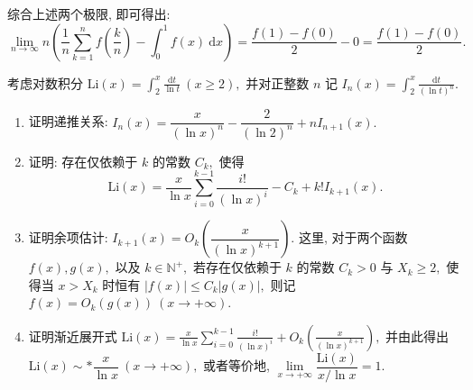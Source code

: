 \begin{solution}
\begin{enumerate}
综合上述两个极限, 即可得出:
\[
\lim_{n \to \infty} n \left( \frac{1}{n} \sum_{k=1}^n f\left(\frac{k}{n}\right) - \int_0^1 f(x) ~ \mathrm{d}x \right) = \frac{f(1) - f(0)}{2} - 0 = \frac{f(1) - f(0)}{2}.
\]
\end{enumerate}
\end{solution}

\begin{question}[points = 12]
考虑对数积分 $\displaystyle \mathrm{Li}(x) = \int_2^x \frac{\mathrm{d}t}{\ln t}\ (x \ge 2),$ 并对正整数 $n$ 记 $\displaystyle I_n(x) = \int_2^x \frac{\mathrm{d}t}{(\ln t)^n}.$
\begin{enumerate}
\item 证明递推关系: $I_n(x) = \dfrac{x}{(\ln x)^n} - \dfrac{2}{(\ln 2)^n} + n I_{n+1}(x).$
\item 证明: 存在仅依赖于 $k$ 的常数 $C_k,$ 使得
$$\mathrm{Li}(x) = \frac{x}{\ln x} \sum_{i=0}^{k-1} \frac{i!}{(\ln x)^i} - C_k + k! I_{k+1}(x).$$
\item 证明余项估计: $I_{k+1}(x) = O_k\left( \dfrac{x}{(\ln x)^{k+1}} \right).$ 这里, 对于两个函数 $f(x), g(x),$ 以及 $k \in \mathbb{N}^+,$ 若存在仅依赖于 $k$ 的常数 $C_k > 0$ 与 $X_k \ge 2,$ 使得当 $x > X_k$ 时恒有 $|f(x)| \leqslant C_k|g(x)|,$ 则记 $f(x) = O_k(g(x))\ (x \to +\infty).$
\item 证明渐近展开式 $\displaystyle \mathrm{Li}(x) = \frac{x}{\ln x} \sum_{i=0}^{k-1} \frac{i!}{(\ln x)^i} + O_k\left( \frac{x}{(\ln x)^{k+1}} \right),$ 并由此得出 $\mathrm{Li}(x) \sim* \dfrac{x}{\ln x} ~ (x \to +\infty),$ 或者等价地, $\displaystyle \lim\limits_{x \to +\infty} \dfrac{\mathrm{Li}(x)}{x / \ln x} = 1.$
\end{enumerate}

\end{question}

